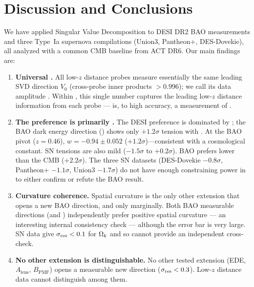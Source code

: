 
\section{Discussion and Conclusions}
\label{sec:conclusions}

We have applied Singular Value Decomposition to DESI DR2 BAO measurements and three Type~Ia supernova compilations (Union3, Pantheon+, DES-Dovekie), all analyzed with a common CMB baseline from ACT DR6. Our main findings are:

\begin{enumerate}

\item \textbf{Universal \czero.} All low-$z$ distance probes measure essentially the same leading SVD direction $V_0$ (cross-probe inner products $> 0.996$); we call its data amplitude \czero. Within \LCDM, this single number captures the leading low-$z$ distance information from each probe --- \czero is, to high accuracy, a measurement of \omh.

\item \textbf{The \wowa preference is primarily \czero.} The DESI \wowa preference is dominated by \czero; the BAO dark energy direction (\cone) shows only $+1.2\sigma$ tension with \LCDM. At the BAO \cone pivot ($z = 0.46$), $w = -0.94 \pm 0.052$ ($+1.2\sigma$)---consistent with a cosmological constant. SN \cone tensions are also mild ($-1.5\sigma$ to $+0.2\sigma$). BAO prefers lower \omh than the CMB ($+2.2\sigma$). The three SN datasets (DES-Dovekie $-0.8\sigma$, Pantheon+ $-1.1\sigma$, Union3 $-1.7\sigma$) do not have enough constraining power in \czero to either confirm or refute the BAO result.

\item \textbf{Curvature coherence.} Spatial curvature is the only other extension that opens a new BAO direction, and only marginally. Both BAO measurable directions (\czero and \cone) independently prefer positive spatial curvature --- an interesting internal consistency check --- although the \cone error bar is very large. SN data give $\sigma_{\mathrm{res}} < 0.1$ for $\Omega_k$ and so cannot provide an independent cross-check.

\item \textbf{No other extension is distinguishable.} No other tested extension (EDE, $A_\mathrm{lens}$, $B_\mathrm{PMF}$) opens a measurable new direction ($\sigma_{\mathrm{res}} < 0.3$). Low-$z$ distance data cannot distinguish among them.
 

\end{enumerate}
